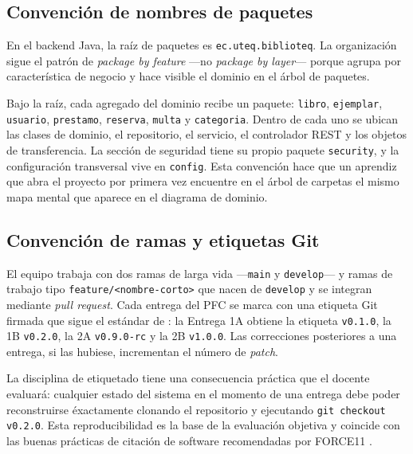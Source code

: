 \subsection{Convenci\'on de nombres de paquetes}
\label{sec:u0:repo:paquetes}

En el backend Java, la ra\'iz de paquetes es \texttt{ec.uteq.biblioteq}. La organizaci\'on sigue el patr\'on de \emph{package by feature} ---no \emph{package by layer}--- porque agrupa por caracter\'istica de negocio y hace visible el dominio en el \'arbol de paquetes.

Bajo la ra\'iz, cada agregado del dominio recibe un paquete: \texttt{libro}, \texttt{ejemplar}, \texttt{usuario}, \texttt{prestamo}, \texttt{reserva}, \texttt{multa} y \texttt{categoria}. Dentro de cada uno se ubican las clases de dominio, el repositorio, el servicio, el controlador REST y los objetos de transferencia. La secci\'on de seguridad tiene su propio paquete \texttt{security}, y la configuraci\'on transversal vive en \texttt{config}. Esta convenci\'on hace que un aprendiz que abra el proyecto por primera vez encuentre en el \'arbol de carpetas el mismo mapa mental que aparece en el diagrama de dominio.

\subsection{Convenci\'on de ramas y etiquetas Git}
\label{sec:u0:repo:git}

El equipo trabaja con dos ramas de larga vida ---\texttt{main} y \texttt{develop}--- y ramas de trabajo tipo \texttt{feature/<nombre-corto>} que nacen de \texttt{develop} y se integran mediante \emph{pull request}. Cada entrega del PFC se marca con una etiqueta Git firmada que sigue el est\'andar de  \cite{prestonwerner2013semver}: la Entrega 1A obtiene la etiqueta \texttt{v0.1.0}, la 1B \texttt{v0.2.0}, la 2A \texttt{v0.9.0-rc} y la 2B \texttt{v1.0.0}. Las correcciones posteriores a una entrega, si las hubiese, incrementan el n\'umero de \emph{patch}.

La disciplina de etiquetado tiene una consecuencia pr\'actica que el docente evaluar\'a: cualquier estado del sistema en el momento de una entrega debe poder reconstruirse \'exactamente clonando el repositorio y ejecutando \texttt{git checkout v0.2.0}. Esta reproducibilidad es la base de la evaluaci\'on objetiva y coincide con las buenas pr\'acticas de citaci\'on de software recomendadas por FORCE11 \cite{smith2016software}.

